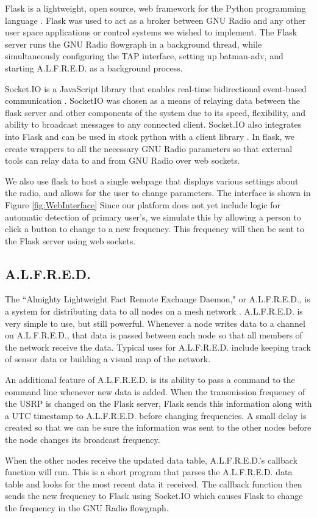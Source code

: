 Flask is a lightweight, open source, web framework for the Python programming language \cite{0011}. Flask was used to act as a broker between GNU Radio and any other user space applications or control systems we wished to implement. The Flask server runs the GNU Radio flowgraph in a background thread, while simultaneously configuring the TAP interface, setting up batman-adv, and starting A.L.F.R.E.D. as a background process. 

Socket.IO is a JavaScript library that enables real-time bidirectional event-based communication \cite{0012}.  SocketIO was chosen as a means of relaying data between the flask server and other components of the system due to its speed, flexibility, and ability to broadcast messages to any connected client. Socket.IO also integrates into Flask \cite{0013} and can be used in stock python with a client library \cite{0014}. In flask, we create wrappers to all the necessary GNU Radio parameters so that external tools can relay data to and from GNU Radio over web sockets.  

We also use flask to host a single webpage that displays various settings about the radio, and allows for the user to change parameters. The interface is shown in Figure \ref{fig:WebInterface} Since our platform does not yet include logic for automatic detection of primary user's, we simulate this by allowing a person to click a button to change to a new frequency. This frequency will then be sent to the Flask server using web sockets.  

\subsection{A.L.F.R.E.D.}

 The ``Almighty Lightweight Fact Remote Exchange Daemon," or A.L.F.R.E.D., is a system for distributing data to all nodes on a mesh network \cite{0015}. A.L.F.R.E.D. is very simple to use, but still powerful. Whenever a node writes data to a channel on A.L.F.R.E.D., that data is passed between each node so that all members of the network receive the data. Typical uses for A.L.F.R.E.D. include keeping track of sensor data or building a visual map of the network. 

 An additional feature of A.L.F.R.E.D. is its ability to pass a command to the command line whenever new data is added. When the transmission frequency of the USRP is changed on the Flask server, Flask sends this information along with a UTC timestamp to A.L.F.R.E.D. before changing frequencies. A small delay is created so that we can be sure the information was sent to the other nodes before the node changes its broadcast frequency.  

 When the other nodes receive the updated data table, A.L.F.R.E.D.'s callback function will run. This is a short program that parses the A.L.F.R.E.D. data table and looks for the most recent data it received. The callback function then sends the new frequency to Flask using Socket.IO which causes Flask to change the frequency in the GNU Radio flowgraph.   